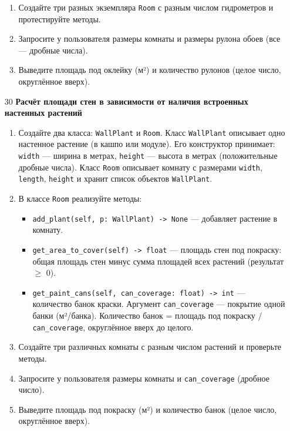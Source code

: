 \begin{enumerate}
\begin{enumerate}
    \item Создайте три разных экземпляра \texttt{Room} с разным числом гидрометров и протестируйте методы.

    \item Запросите у пользователя размеры комнаты и размеры рулона обоев (все — дробные числа).

    \item Выведите площадь под оклейку (м²) и количество рулонов (целое число, округлённое вверх).
\end{enumerate}

\item[30] \textbf{Расчёт площади стен в зависимости от наличия встроенных настенных растений}
\begin{enumerate}
    \item Создайте два класса: \texttt{WallPlant} и \texttt{Room}.  
    Класс \texttt{WallPlant} описывает одно настенное растение (в кашпо или модуле). Его конструктор принимает:  
    \texttt{width} — ширина в метрах,  
    \texttt{height} — высота в метрах (положительные дробные числа).  
    Класс \texttt{Room} описывает комнату с размерами \texttt{width}, \texttt{length}, \texttt{height} и хранит список объектов \texttt{WallPlant}.

    \item В классе \texttt{Room} реализуйте методы:  
    \begin{itemize}
        \item \texttt{add\_plant(self, p: WallPlant) -> None} — добавляет растение в комнату.
        \item \texttt{get\_area\_to\_cover(self) -> float} — площадь стен под покраску: общая площадь стен минус сумма площадей всех растений (результат $\geqslant$ 0).
        \item \texttt{get\_paint\_cans(self, can\_coverage: float) -> int} — количество банок краски. Аргумент \texttt{can\_coverage} — покрытие одной банки (м²/банка). Количество банок = площадь под покраску / \texttt{can\_coverage}, округлённое вверх до целого.
    \end{itemize}

    \item Создайте три различных комнаты с разным числом растений и проверьте методы.

    \item Запросите у пользователя размеры комнаты и \texttt{can\_coverage} (дробное число).

    \item Выведите площадь под покраску (м²) и количество банок (целое число, округлённое вверх).
\end{enumerate}


\end{enumerate}
